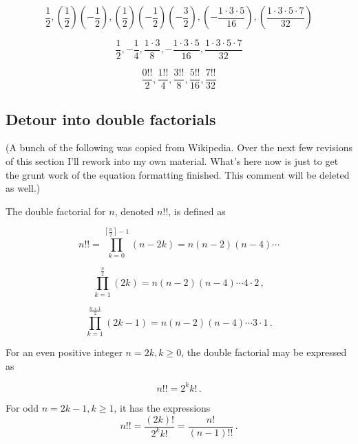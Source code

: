 \documentclass{article}
\begin{document}
\begin{equation}
  \frac{1}{2},
  \left(\frac{1}{2}\right)\left(-\frac{1}{2}\right),
  \left(\frac{1}{2}\right)\left(-\frac{1}{2}\right)\left(-\frac{3}{2}\right),
  \left(-\frac{1\cdot3\cdot5}{16}\right),
  \left(\frac{1\cdot3\cdot5\cdot7}{32}\right)
\end{equation}

\begin{equation}
  \frac{1}{2},
  -\frac{1}{4},
  \frac{1\cdot3}{8},
  -\frac{1\cdot3\cdot5}{16},
  \frac{1\cdot3\cdot5\cdot7}{32}
\end{equation}

\begin{equation}
  \frac{0!!}{2},
  \frac{1!!}{4},
  \frac{3!!}{8},
  \frac{5!!}{16},
  \frac{7!!}{32}
\end{equation}

\subsection{Detour into double factorials}

(A bunch of the following was copied from Wikipedia. Over the next few
revisions of this section I'll rework into my own material. What's here
now is just to get the grunt work of the equation formatting finished.
This comment will be deleted as well.)

The double factorial for $n$, denoted $n!!$, is defined as

\begin{equation}
  n!! = \prod_{k=0}^{\left\lceil\frac{n}{2}\right\rceil - 1} (n-2k) = n (n-2) (n-4) \cdots
\end{equation}

\begin{equation}
  \prod_{k=1}^\frac{n}{2} (2k) = n(n-2)(n-4)\cdots 4\cdot 2\,,
\end{equation}

\begin{equation}
  \prod_{k=1}^\frac{n+1}{2} (2k-1) = n(n-2)(n-4)\cdots 3\cdot 1 \,.
\end{equation}

For an even positive integer $n = 2k, k \geq 0$, the double factorial may be expressed as

\begin{equation}\label{eq:df-even}
{\displaystyle n!!=2^{k}k!\,.}
\end{equation}

For odd $n = 2k - 1, k \geq 1$, it has the expressions
\begin{equation}\label{eq:df-odd}
{\displaystyle n!!={\frac {(2k)!}{2^{k}k!}}={\frac {n!}{(n-1)!!}}\,.}
\end{equation}
\end{document}
